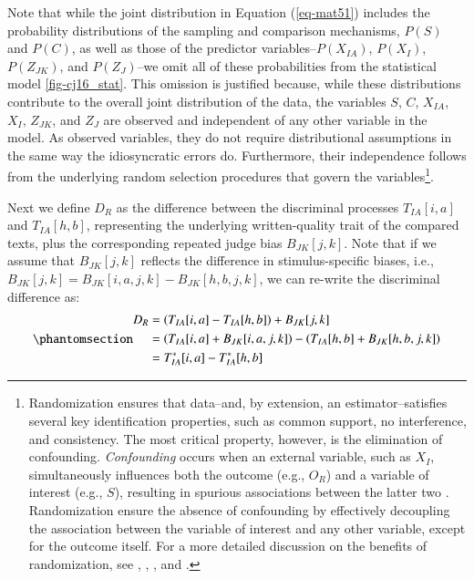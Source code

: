 \documentclass[
  authoryear,
  review,
  1p]{elsarticle}
\begin{document}
Note that while the joint distribution in Equation (\ref{eq-mat51})
includes the probability distributions of the sampling and comparison
mechanisms, \(P(S)\) and \(P(C)\), as well as those of the predictor
variables--\(P(X_{IA})\), \(P(X_{I})\), \(P(Z_{JK})\), and
\(P(Z_{J})\)--we omit all of these probabilities from the statistical
model \ref{fig-cj16_stat}. This omission is justified because, while
these distributions contribute to the overall joint distribution of the
data, the variables \(S\), \(C\), \(X_{IA}\), \(X_{I}\), \(Z_{JK}\), and
\(Z_{J}\) are observed and independent of any other variable in the
model. As observed variables, they do not require distributional
assumptions in the same way the idiosyncratic errors do. Furthermore,
their independence follows from the underlying random selection
procedures that govern the variables\footnote{Randomization ensures that
  data--and, by extension, an estimator--satisfies several key
  identification properties, such as common support, no interference,
  and consistency. The most critical property, however, is the
  elimination of confounding. \emph{Confounding} occurs when an external
  variable, such as \(X_{I}\), simultaneously influences both the
  outcome (e.g., \(O_{R}\)) and a variable of interest (e.g., \(S\)),
  resulting in spurious associations between the latter two
  \citep{Everitt_et_al_2010}. Randomization ensure the absence of
  confounding by effectively decoupling the association between the
  variable of interest and any other variable, except for the outcome
  itself. For a more detailed discussion on the benefits of
  randomization, see \citet{Pearl_2009}, \citet{Morgan_et_al_2014},
  \citet{Neal_2020}, and \citet{Hernan_et_al_2025}.}.

Next we define \(D_{R}\) as the difference between the discriminal
processes \(T_{IA}[i, a]\) and \(T_{IA}[h, b]\), representing the
underlying written-quality trait of the compared texts, plus the
corresponding repeated judge bias \(B_{JK}[j, k]\). Note that if we
assume that \(B_{JK}[j,k]\) reflects the difference in stimulus-specific
biases, i.e., \(B_{JK}[j,k] = B_{JK}[i,a,j,k] - B_{JK}[h,b,j,k]\), we
can re-write the discriminal difference as:
\begin{equation}\phantomsection\label{eq-mat52}{
\begin{aligned}
D_{R} &= \left( T_{IA}[i,a] - T_{IA}[h,b] \right) + B_{JK}[j,k] \\
&= \left( T_{IA}[i, a] + B_{JK}[i, a, j, k] \right) - \left( T_{IA}[h, b] + B_{JK}[h, b, j, k] \right) \\
& = T^{*}_{IA}[i,a] - T^{*}_{IA}[h,b]
\end{aligned}
}\end{equation}
\end{document}

